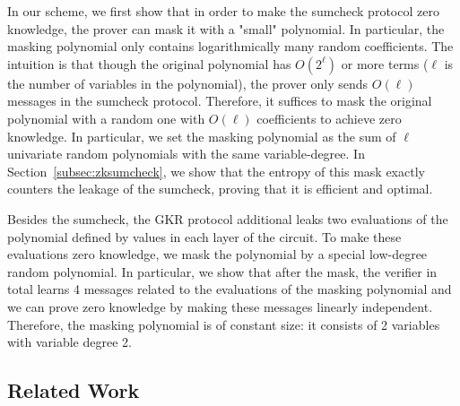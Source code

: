 In our scheme, we first show that in order to make the sumcheck protocol zero knowledge, the prover can mask it with a "small" polynomial. In particular, the masking polynomial only contains logarithmically many random coefficients. The intuition is that though the original polynomial has $O(2^\ell)$ or more terms ($\ell$ is the number of variables in the polynomial), the prover only sends $O(\ell)$ messages in the sumcheck protocol. Therefore, it suffices to mask the original polynomial with a random one with $O(\ell)$ coefficients to achieve zero knowledge. In particular, we set the masking polynomial as the sum of $\ell$ univariate random polynomials with the same variable-degree. In Section~\ref{subsec:zksumcheck}, we show that the entropy of this mask exactly counters the leakage of the sumcheck, proving that it is efficient and optimal.

Besides the sumcheck, the GKR protocol additional leaks two evaluations of the polynomial defined by values in each layer of the circuit. To make these evaluations zero knowledge, we mask the polynomial by a special low-degree random polynomial. In particular, we show that after the mask, the verifier in total learns 4 messages related to the evaluations of the masking polynomial and we can prove zero knowledge by making these messages linearly independent. Therefore, the masking polynomial is of constant size: it consists of 2 variables with variable degree 2.


\subsection{Related Work}
